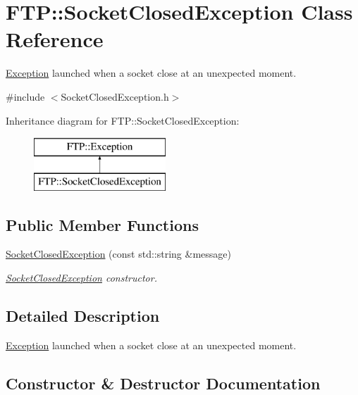 \hypertarget{classFTP_1_1SocketClosedException}{}\section{F\+T\+P\+:\+:Socket\+Closed\+Exception Class Reference}
\label{classFTP_1_1SocketClosedException}


\hyperlink{classFTP_1_1Exception}{Exception} launched when a socket close at an unexpected moment.  




{\ttfamily \#include $<$Socket\+Closed\+Exception.\+h$>$}

Inheritance diagram for F\+T\+P\+:\+:Socket\+Closed\+Exception\+:\begin{figure}[H]
\begin{center}
\leavevmode
\includegraphics[height=2.000000cm]{classFTP_1_1SocketClosedException}
\end{center}
\end{figure}
\subsection*{Public Member Functions}
\begin{DoxyCompactItemize}
\item 
\hyperlink{classFTP_1_1SocketClosedException_a7cb19ab266ad0cea447bae3ded2be68a}{Socket\+Closed\+Exception} (const std\+::string \&message)
\begin{DoxyCompactList}\small\item\em \hyperlink{classFTP_1_1SocketClosedException}{Socket\+Closed\+Exception} constructor. \end{DoxyCompactList}\end{DoxyCompactItemize}


\subsection{Detailed Description}
\hyperlink{classFTP_1_1Exception}{Exception} launched when a socket close at an unexpected moment. 

\subsection{Constructor \& Destructor Documentation}
\hypertarget{classFTP_1_1SocketClosedException_a7cb19ab266ad0cea447bae3ded2be68a}{}
